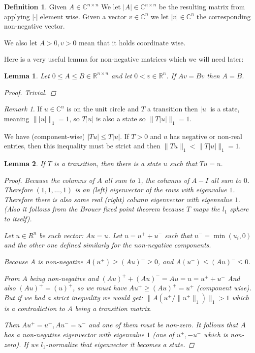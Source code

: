 \documentclass[a4paper,10pt]{article}
\newcommand{\C}{\mathbb{C}}
\newcommand{\R}{\mathbb{R}}
\newcommand{\gt}{>}
\newcommand{\lt}{<}
\theoremstyle{definition}
\newtheorem{mydef}{Definition}[section]
\theoremstyle{remark}
\newtheorem{remark}{Remark}
\theoremstyle{plain}
\newtheorem{lemma}{Lemma}[section]
\begin{document}
\begin{mydef}
\label{def:abs}
Given $A \in \C^{n \times n}$ We let $|A| \in \C^{n \times n}$ be the resulting
matrix from applying $|\cdot|$ element wise. Given a vector $v \in \C^n$ we let
$|v| \in \C^n$ the corresponding non-negative vector.

We also let $A \gt 0, v \gt 0$ mean that it holds coordinate wise. 
\end{mydef}

Here is a very useful lemma for non-negative matrices which we will need later:
\begin{lemma}
\label{lem:eqal_by_vector}
Let $0 \leq A \leq B \in \R^{n \times n}$ 
and let $0 \lt v \in \R^n$.
If $Av = Bv$ then $A = B$.
\begin{proof}
Trivial.
\end{proof}
\end{lemma}

\begin{remark}
\label{remark:abs}
If $u \in \C^n$ is on the unit circle and $T$ a transition then
$|u|$ is a state, meaning $\||u|\|_1=1$, so $T|u|$ is also a state 
so $\|T|u|\|_1=1$.

We have (component-wise) $|Tu| \leq T|u|$. If $T>0$ and $u$ has negative or
non-real entries, then this inequality must be strict and
then $\|Tu\|_1 \lt \|T|u|\|_1 = 1$.
\end{remark}

\begin{lemma}
\label{lem:exist1}
If $T$ is a transition, then
there is a state $u$ such that $Tu = u$.
\begin{proof}
Because the columns of $A$ all sum to $1$, the columns of $A-I$ all sum to $0$.
Therefore $(1,1, \dots, 1)$ is an (left) eigenvector of the rows with eigenvalue $1$.
Therefore there is also some real (right) column eigenvector with eigenvalue $1$. 
(Also it follows from the Brouer fixed point theorem because $T$ maps the $l_1$
sphere to itself).

Let $u \in R^n$ be such vector: $Au=u$. Let $u = u^+ + u^-$ such that $u^- =
\min(u_i,0)$ and the other one defined similarly for the non-negative components.

Because $A$ is non-negative $A(u^+) \geq (Au)^+ \geq 0$,
and $A(u^-) \leq (Au)^- \leq 0$.

From $A$ being
non-negative and $(Au)^+ + (Au)^- = Au = u = u^+ + u^-$
And also $(A u)^+ = (u)^+$, so we must have $Au^+ \geq (Au)^+ = u^+$ 
(component wise). But if we had a strict inequality we would get:
$\|A(u^+/\|u^+\|_1)\|_1 > 1$ which is a contradiction to $A$ being a transition
matrix.

Then $A u^+ = u^+, A u^- = u^-$ and one of them must be non-zero. It follows
that $A$ has a non-negative eigenvector with eigenvalue $1$ (one of $u^+, -u^-$
which is non-zero). If we $l_1$-normalize that eigenvector it becomes a state.
\end{proof}
\end{lemma}
\end{document}
